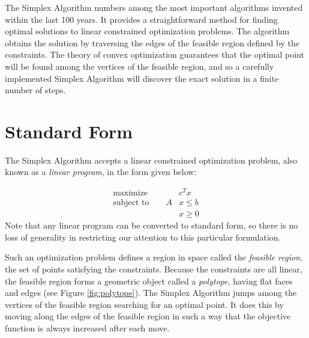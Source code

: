 \label{lab:Simplex}

The Simplex Algorithm numbers among the most important algorithms invented within the last 100 years.
It provides a straightforward method for finding optimal solutions to linear constrained optimization problems.
The algorithm obtains the solution by traversing the edges of the feasible region defined by the constraints.
The theory of convex optimization guarantees that the optimal point will be found among the vertices of the feasible
region, and so a carefully implemented Simplex Algorithm will discover the exact solution in a finite number of steps.

\section*{Standard Form}
The Simplex Algorithm accepts a linear constrained optimization problem, also known as a \emph{linear program},
in the form given below:

\begin{align*}
\text{maximize}\qquad &c^Tx \\
\text{subject to}\qquad A&x \leq b \\
 &x \geq 0
\end{align*}
Note that any linear program can be converted to standard form, so there is no loss of
generality in restricting our attention to this particular formulation.

Such an optimization problem defines a region in space called the \emph{feasible region}, the set of points
satisfying the constraints. Because the constraints are all linear, the feasible region forms a geometric object
called a \emph{polytope}, having flat faces and edges (see Figure \ref{fig:polytope}).
The Simplex Algorithm jumps among the vertices of the feasible region searching for an optimal point.
It does this by moving along the edges of the feasible region in such a way that the objective function
is always increased after each move.


